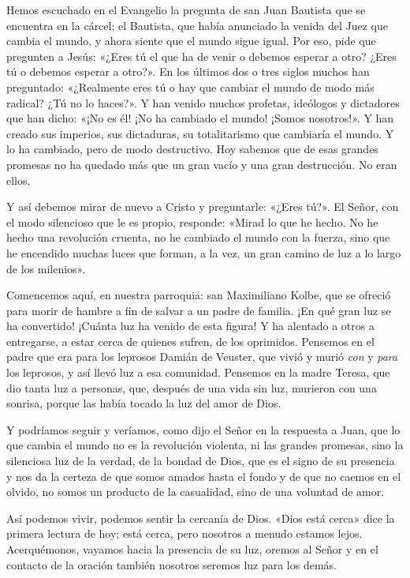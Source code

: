 Hemos escuchado en el Evangelio la pregunta de san Juan Bautista que se
encuentra en la cárcel; el Bautista, que había anunciado la venida del
Juez que cambia el mundo, y ahora siente que el mundo sigue igual. Por
eso, pide que pregunten a Jesús: «¿Eres tú el que ha de venir o debemos
esperar a otro? ¿Eres tú o debemos esperar a otro?». En los últimos dos
o tres siglos muchos han preguntado: «¿Realmente eres tú o hay que
cambiar el mundo de modo más radical? ¿Tú no lo haces?». Y han venido
muchos profetas, ideólogos y dictadores que han dicho: «¡No es él! ¡No
ha cambiado el mundo! ¡Somos nosotros!». Y han creado sus imperios, sus
dictaduras, su totalitarismo que cambiaría el mundo. Y lo ha cambiado,
pero de modo destructivo. Hoy sabemos que de esas grandes promesas no ha
quedado más que un gran vacío y una gran destrucción. No eran ellos.

Y así debemos mirar de nuevo a Cristo y preguntarle: «¿Eres tú?». El
Señor, con el modo silencioso que le es propio, responde: «Mirad lo que
he hecho. No he hecho una revolución cruenta, no he cambiado el mundo
con la fuerza, sino que he encendido muchas luces que forman, a la vez,
un gran camino de luz a lo largo de los milenios».

Comencemos aquí, en nuestra parroquia: san Maximiliano Kolbe, que se
ofreció para morir de hambre a fin de salvar a un padre de familia. ¡En
qué gran luz se ha convertido! ¡Cuánta luz ha venido de esta figura! Y
ha alentado a otros a entregarse, a estar cerca de quienes sufren, de
los oprimidos. Pensemos en el padre que era para los leprosos Damián de
Veuster, que vivió y murió \emph{con} y \emph{para} los leprosos, y así
llevó luz a esa comunidad. Pensemos en la madre Teresa, que dio tanta
luz a personas, que, después de una vida sin luz, murieron con una
sonrisa, porque las había tocado la luz del amor de Dios.

Y podríamos seguir y veríamos, como dijo el Señor en la respuesta a
Juan, que lo que cambia el mundo no es la revolución violenta, ni las
grandes promesas, sino la silenciosa luz de la verdad, de la bondad de
Dios, que es el signo de su presencia y nos da la certeza de que somos
amados hasta el fondo y de que no caemos en el olvido, no somos un
producto de la casualidad, sino de una voluntad de amor.

Así podemos vivir, podemos sentir la cercanía de Dios. «Dios está cerca»
dice la primera lectura de hoy; está cerca, pero nosotros a menudo
estamos lejos. Acerquémonos, vayamos hacia la presencia de su luz,
oremos al Señor y en el contacto de la oración también nosotros seremos
luz para los demás.


